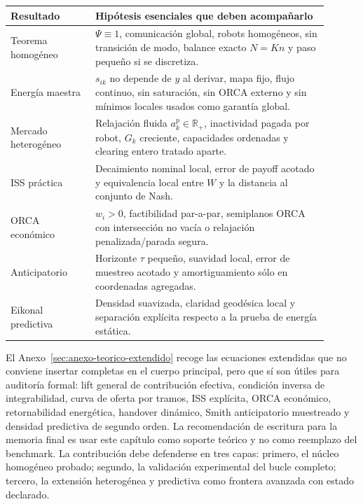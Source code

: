 \begingroup
\small
\setlength{\tabcolsep}{3pt}
\begin{longtable}{@{}p{0.24\linewidth}p{0.66\linewidth}@{}}
\toprule
\textbf{Resultado} & \textbf{Hipótesis esenciales que deben acompañarlo} \\
\midrule
Teorema homogéneo & $\Psi\equiv1$, comunicación global, robots homogéneos,
sin transición de modo, balance exacto $N=Kn$ y paso pequeño si se discretiza. \\
Energía maestra & $s_{ik}$ no depende de $y$ al derivar, mapa fijo, flujo continuo,
sin saturación, sin ORCA externo y sin mínimos locales usados como garantía global. \\
Mercado heterogéneo & Relajación fluida $a_k^p\in\mathbb{R}_+$, inactividad pagada por
robot, $G_k$ creciente, capacidades ordenadas y clearing entero tratado aparte. \\
ISS práctica & Decaimiento nominal local, error de payoff acotado y equivalencia local
entre $W$ y la distancia al conjunto de Nash. \\
ORCA económico & $w_i>0$, factibilidad par-a-par, semiplanos ORCA con intersección
no vacía o relajación penalizada/parada segura. \\
Anticipatorio & Horizonte $\tau$ pequeño, suavidad local, error de muestreo acotado y
amortiguamiento sólo en coordenadas agregadas. \\
Eikonal predictiva & Densidad suavizada, claridad geodésica local y separación explícita
respecto a la prueba de energía estática. \\
\bottomrule
\end{longtable}
\endgroup

El Anexo~\ref{sec:anexo-teorico-extendido} recoge las ecuaciones extendidas que no
conviene insertar completas en el cuerpo principal, pero que sí son útiles para auditoría
formal: lift general de contribución efectiva, condición inversa de integrabilidad,
curva de oferta por tramos, ISS explícita, ORCA económico, retornabilidad energética,
handover dinámico, Smith anticipatorio muestreado y densidad predictiva de segundo
orden. La recomendación de escritura para la memoria final es usar este capítulo como
soporte teórico y no como reemplazo del benchmark. La contribución debe defenderse en
tres capas: primero, el núcleo homogéneo probado; segundo, la validación experimental
del bucle completo; tercero, la extensión heterogénea y predictiva como frontera
avanzada con estado declarado.
